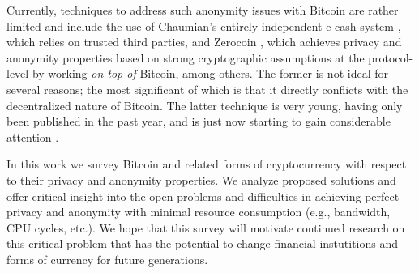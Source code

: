 Currently, techniques to address such anonymity issues with Bitcoin are rather limited and include the use of Chaumian's entirely independent e-cash system \cite{chaumain}, which relies on trusted third parties, and Zerocoin \cite{zerocoin}, which achieves privacy and anonymity properties based on strong cryptographic assumptions at the protocol-level by working \emph{on top of} Bitcoin, among others. The former is not ideal for several reasons; the most significant of which is that it directly conflicts with the decentralized nature of Bitcoin. The latter technique is very young, having only been published in the past year, and is just now starting to gain considerable attention \cite{pinocchio}. 

In this work we survey Bitcoin and related forms of cryptocurrency with respect to their privacy and anonymity properties. We analyze proposed solutions and offer critical insight into the open problems and difficulties in achieving perfect privacy and anonymity with minimal resource consumption (e.g., bandwidth, CPU cycles, etc.). We hope that this survey will motivate continued research on this critical problem that has the potential to change financial instutitions and forms of currency for future generations.

